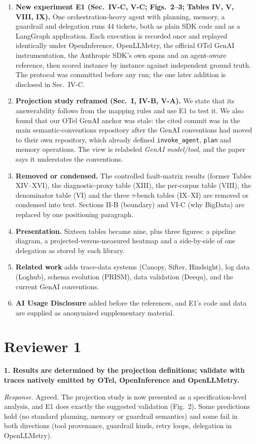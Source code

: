\documentclass[10pt]{article}
\newcommand{\rc}[1]{\par\medskip\textbf{#1}\par}
\newcommand{\resp}{\par\emph{Response.} }
\begin{document}
\begin{enumerate}
\item \textbf{New experiment E1 (Sec.~IV-C, V-C; Figs.~2--3; Tables IV, V,
  VIII, IX).} One orchestration-heavy agent with planning, memory, a
  guardrail and delegation runs 44 tickets, both as plain SDK code and as a
  LangGraph application. Each execution is recorded once and replayed
  identically under OpenInference, OpenLLMetry, the official OTel GenAI
  instrumentation, the Anthropic SDK's own spans and an agent-aware
  reference, then scored instance by instance against independent ground
  truth. The protocol was committed before any run; the one later
  addition is disclosed in Sec.~IV-C.
\item \textbf{Projection study reframed (Sec.~I, IV-B, V-A).} We state
  that its answerability follows from the mapping rules and use E1 to
  test it. We also found that our OTel GenAI anchor was stale: the cited
  commit was in the main semantic-conventions repository after the GenAI
  conventions had moved to their own repository, which already defined
  \texttt{invoke\_agent}, \texttt{plan} and memory operations. The view is
  relabeled \emph{GenAI model/tool}, and the paper says it understates the
  conventions.
\item \textbf{Removed or condensed.} The controlled fault-matrix results
  (former Tables XIV--XVI), the diagnostic-proxy table (XIII), the
  per-corpus table (VIII), the denominator table (VI) and the three
  $\tau$-bench tables (IX--XI) are removed or condensed into text.
  Sections II-B (boundary) and VI-C (why BigData) are replaced by one
  positioning paragraph.
\item \textbf{Presentation.} Sixteen tables became nine, plus three
  figures: a pipeline diagram, a projected-versus-measured heatmap and a
  side-by-side of one delegation as stored by each library.
\item \textbf{Related work} adds trace-data systems (Canopy, Sifter,
  Hindsight), log data (Loghub), schema evolution (PRISM), data
  validation (Deequ), and the current GenAI conventions.
\item \textbf{AI Usage Disclosure} added before the references, and E1's
  code and data are supplied as anonymized supplementary material.
\end{enumerate}

\section*{Reviewer 1}
\rc{1. Results are determined by the projection definitions; validate with
traces natively emitted by OTel, OpenInference and OpenLLMetry.}
\resp Agreed. The projection study is now presented as a specification-level
analysis, and E1 does exactly the suggested validation (Fig.~2). Some
predictions hold (no standard planning, memory or guardrail semantics)
and some fail in both directions (tool provenance, guardrail kinds, retry
loops, delegation in OpenLLMetry).
\end{document}
